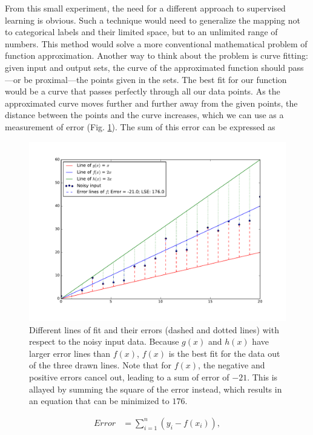 From this small experiment, the need for a different approach to supervised learning is obvious. Such a technique would need to generalize the mapping not to categorical labels and their limited space, but to an unlimited range of numbers. This method would solve a more conventional mathematical problem of function approximation. Another way to think about the problem is curve fitting: given input and output sets, the curve of the approximated function should pass---or be proximal---the points given in the sets. The best fit for our function would be a curve that passes perfectly through all our data points. As the approximated curve moves further and further away from the given points, the distance between the points and the curve increases, which we can use as a measurement of error (Fig. \ref{fig:error_lines}). The sum of this error can be expressed as

\begin{figure}[!h]
  \centering
  \includegraphics[width=\linewidth]{figures/error_lines.pdf}
  \caption{Different lines of fit and their errors (dashed and dotted lines) with respect to the noisy input data. Because $g(x)$ and $h(x)$ have larger error lines than $f(x)$, $f(x)$ is the best fit for the data out of the three drawn lines. Note that for $f(x)$, the negative and positive errors cancel out, leading to a sum of error of $-21$. This is allayed by summing the square of the error instead, which results in an equation that can be minimized to $176$.}
  \label{fig:error_lines}
\end{figure}

\begin{align*}
  Error &= \sum_{i=1}^n (y_i-f(x_i)),
\end{align*}

